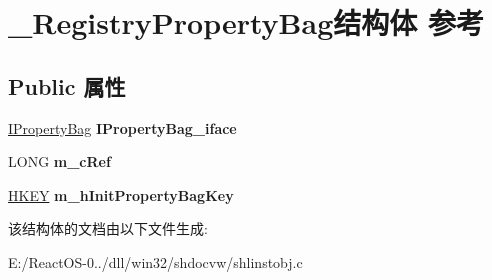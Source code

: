 \hypertarget{struct___registry_property_bag}{}\section{\+\_\+\+Registry\+Property\+Bag结构体 参考}
\label{struct___registry_property_bag}
\subsection*{Public 属性}
\begin{DoxyCompactItemize}
\item 
\mbox{\label{struct___registry_property_bag_a67d3b6002b10ef0e4a45da0e1986e8dd}} 
\hyperlink{interface_i_property_bag}{I\+Property\+Bag} {\bfseries I\+Property\+Bag\+\_\+iface}
\item 
\mbox{\label{struct___registry_property_bag_a2df6635856c3040398cf9cef9e3ed451}} 
L\+O\+NG {\bfseries m\+\_\+c\+Ref}
\item 
\mbox{\label{struct___registry_property_bag_a4bae93171a820c71b37a3b59eb4871a6}} 
\hyperlink{interfacevoid}{H\+K\+EY} {\bfseries m\+\_\+h\+Init\+Property\+Bag\+Key}
\end{DoxyCompactItemize}


该结构体的文档由以下文件生成\+:\begin{DoxyCompactItemize}
\item 
E\+:/\+React\+O\+S-\/0../dll/win32/shdocvw/shlinstobj.\+c\end{DoxyCompactItemize}
